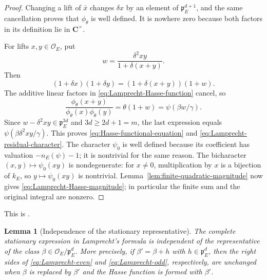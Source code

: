 \documentclass[11pt]{amsart}
\newtheorem{lemma}[theorem]{Lemma}
\theoremstyle{definition}
\theoremstyle{remark}
\newcommand{\C}{\mathbf C}
\newcommand{\cO}{\mathcal O}
\newcommand{\p}{\mathfrak p}
\begin{document}
\begin{proof}
Changing a lift of $\bar x$ changes $\delta x$ by an element of
$\p_E^{d+1}$, and the same cancellation proves that
$\phi_\theta$ is well defined.  It is nowhere zero because both factors
in its definition lie in $\C^\times$.

For lifts $x,y\in\cO_E$, put
\[
 w=\frac{\delta^2xy}{1+\delta(x+y)}.
\]
Then
\[
 (1+\delta x)(1+\delta y)=(1+\delta(x+y))(1+w).
\]
The additive linear factors in \eqref{eq:Lamprecht-Hasse-function}
cancel, so
\[
 \frac{\phi_\theta(x+y)}{\phi_\theta(x)\phi_\theta(y)}
 =\theta(1+w)=\psi(\beta w/\gamma).
\]
Since $w-\delta^2xy\in\p_E^{3d}$ and
$3d\ge2d+1=m$, the last expression equals
$\psi(\beta\delta^2xy/\gamma)$.  This proves
\eqref{eq:Hasse-functional-equation} and
\eqref{eq:Lamprecht-residual-character}.  The character $\psi_0$ is
well defined because its coefficient has valuation $-n_E(\psi)-1$;
it is nontrivial for the same reason.  The bicharacter
$(x,y)\mapsto\psi_0(xy)$ is nondegenerate: for $x\ne0$, multiplication
by $x$ is a bijection of $k_E$, so $y\mapsto\psi_0(xy)$ is nontrivial.
Lemma~\ref{lem:finite-quadratic-magnitude} now gives
\eqref{eq:Lamprecht-Hasse-magnitude}; in particular the finite sum and
the original integral are nonzero.
\end{proof}

This is \cite[Lemma 8.1, pp.~60--62, and Lemma 9.3, pp.~86--87]{Langlands}.

\begin{lemma}[Independence of the stationary representative]
\label{lem:complete-stationary-invariant}
The complete stationary expression in Lamprecht's formula is independent
of the representative of the class
$\beta\in\cO_E/\p_E^d$.  More precisely, if
$\beta'=\beta+h$ with $h\in\p_E^d$, then the right sides of
\eqref{eq:Lamprecht-even} and \eqref{eq:Lamprecht-odd}, respectively,
are unchanged when $\beta$ is replaced by $\beta'$ and the Hasse
function is formed with $\beta'$.
\end{lemma}
\end{document}
